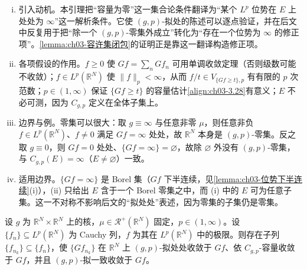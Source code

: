 \documentclass[../../main.tex]{subfiles}%
\begin{document}
\begin{remark}\label{remark:ch03-零集刻画}
\begin{enumerate}[(i)]
\item 引入动机。本引理把“容量为零”这一集合论条件翻译为“某个 $L^p$ 位势在 $E$ 上处处为 $\infty$”这一解析条件。它使 $(g,p)$-拟处的陈述可以逐点验证，并在后文中反复用于把“除一个 $(g,p)$-零集外成立”转化为“存在一个位势为 $\infty$ 的修正项”。\cref{lemma:ch03-容许集闭包}的证明正是靠这一翻译构造修正项。

\item 各项假设的作用。$f\geqslant0$ 使 $Gf=\sum_nGf_n$ 可用单调收敛定理（否则级数可能不收敛）；$f\in L^p(\mathbb{R}^N)$ 使 $\|f\|_p<\infty$，从而 $f/t\in V_{\{Gf\geqslant t\},p}$ 有有限的 $p$ 次范数；$p\in(1,\infty)$ 保证 $\{Gf\geqslant t\}$ 的容量估计\eqref{align:ch03-3.28}有意义；$E$ 不必可测，因为 $C_{g,p}$ 定义在全体子集上。

\item 边界与例。零集可以很大：取 $g\equiv\infty$ 与任意非零 $\mu$，则任意非负 $f\in L^p(\mathbb{R}^N)$、$f\neq0$ 满足 $Gf=\infty$ 处处，故 $\mathbb{R}^N$ 本身是 $(g,p)$-零集。反之取 $g\equiv0$，则 $Gf=0$ 处处、$\{Gf=\infty\}=\varnothing$，故除 $\varnothing$ 外没有 $(g,p)$-零集，与 $C_{g,p}(E)=\infty$（$E\neq\varnothing$）一致。

\item 适用边界。$\{Gf=\infty\}$ 是 Borel 集（$Gf$ 下半连续，见\cref{lemma:ch03-位势下半连续}(i)），(ii) 只给出 $E$ 含于一个 Borel 零集之中，而 (i) 中的 $E$ 可为任意子集。这一不对称不影响后文的“拟处处”表述，因为零集的子集仍是零集。
\end{enumerate}
\end{remark}

\begin{proposition}\label{proposition:ch03-位势子列收敛}
设 $g$ 为 $\mathbb{R}^N\times\mathbb{R}^N$ 上的核，$\mu\in\mathscr{R}^+(\mathbb{R}^N)$ 固定，$p\in(1,\infty)$。设 $\{f_n\}\subseteq L^p(\mathbb{R}^N)$ 为 Cauchy 列，$f$ 为其在 $L^p(\mathbb{R}^N)$ 中的极限。则存在子列 $\{f_{n_k}\}\subseteq\{f_n\}$，使 $\{Gf_{n_k}\}$ 在 $\mathbb{R}^N$ 上 $(g,p)$-拟处处收敛于 $Gf$、依 $C_{g,p}$-容量收敛于 $Gf$，并且 $(g,p)$-拟一致收敛于 $Gf$。
\end{proposition}
\end{document}
